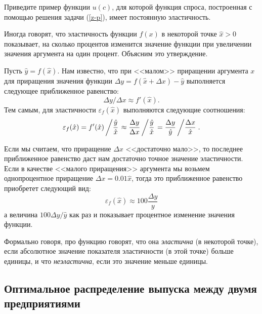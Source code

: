 \begin{exer}
    Приведите пример функции $u(c)$, для которой функция спроса, построенная с помощью
    решения задачи (\ref{z-p}), имеет постоянную эластичность.
\end{exer}







    Иногда говорят, что эластичность функции $f(x)$ в
    некоторой точке $\hat{x}>0$ показывает, на сколько процентов
    изменится значение функции при увеличении значения аргумента
    на один процент. Объясним это утверждение.


         Пусть $\hat{y}=f(\hat{x})$. Нам известно, что при
         <<малом>> приращении аргумента  $x$ для приращения значения
         функции  $\Delta y=f(\hat{x}+\Delta x)-\hat{y}$ выполняется следующее
         приближенное равенство:
     \[\Delta y/\Delta x\approx f'(\hat{x}).\]
    Тем самым, для эластичности $\varepsilon_{f}(\hat{x})$ выполняются следующие
    соотношения:
    \[\varepsilon_{f}(\hat{x})=f'(\hat{x})\left/\frac{\hat{y}}{\hat{x}} \right.\approx
    \frac{\Delta y}{\Delta x}\left/\frac{\hat{y}}{\hat{x}} \right.=
    \frac{\Delta y}{\hat{y}}\left/\frac{\Delta x}{\hat{x}} \right. .\]


    Если мы считаем, что приращение  $\Delta x$ <<достаточно мало>>, то
    последнее приближенное равенство даст нам достаточно точное
    значение эластичности. Если в качестве <<малого приращения>>
    аргумента мы возьмем однопроцентное приращение  $\Delta x=0.01\hat{x}$,
    тогда это приближенное равенство приобретет следующий вид:
    \[\varepsilon_{f}(\hat{x})\approx100\frac{\Delta y}{y} \]
    а величина $100\Delta y/\hat{y}$ как раз и показывает процентное изменение
    значения функции.

    Формально говоря, про функцию говорят, что она \emph{эластична} (в некоторой точке), если
    абсолютное значение показателя эластичности (в этой точке) больше
    единицы, и что \emph{неэластична}, если это значение меньше единицы.









\subsection{Оптимальное распределение выпуска между двумя предприятиями}

